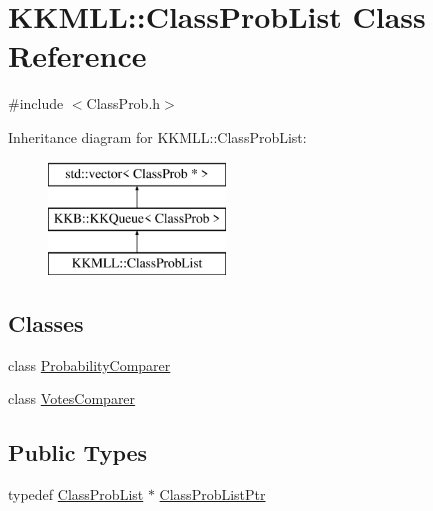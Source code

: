 \hypertarget{class_k_k_m_l_l_1_1_class_prob_list}{}\section{K\+K\+M\+LL\+:\+:Class\+Prob\+List Class Reference}
\label{class_k_k_m_l_l_1_1_class_prob_list}


{\ttfamily \#include $<$Class\+Prob.\+h$>$}

Inheritance diagram for K\+K\+M\+LL\+:\+:Class\+Prob\+List\+:\begin{figure}[H]
\begin{center}
\leavevmode
\includegraphics[height=3.000000cm]{class_k_k_m_l_l_1_1_class_prob_list}
\end{center}
\end{figure}
\subsection*{Classes}
\begin{DoxyCompactItemize}
\item 
class \hyperlink{class_class_prob_list_1_1_probability_comparer}{Probability\+Comparer}
\item 
class \hyperlink{class_class_prob_list_1_1_votes_comparer}{Votes\+Comparer}
\end{DoxyCompactItemize}
\subsection*{Public Types}
\begin{DoxyCompactItemize}
\item 
typedef \hyperlink{class_k_k_m_l_l_1_1_class_prob_list}{Class\+Prob\+List} $\ast$ \hyperlink{class_k_k_m_l_l_1_1_class_prob_list_ae410f9bc9ad2f68c9587ec2ceedb82bd}{Class\+Prob\+List\+Ptr}
\end{DoxyCompactItemize}
